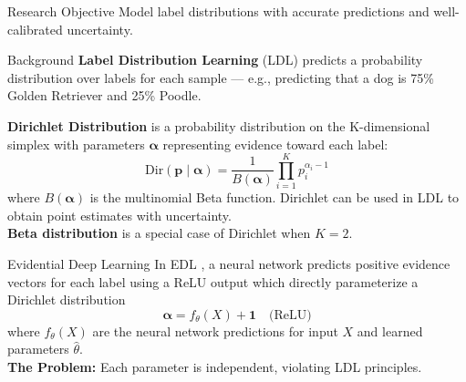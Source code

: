 \documentclass[final]{beamer}
\newlength{\sidewid}
\begin{document}
\begin{frame}
\begin{columns}[t]
\begin{column}{\sidewid} %


\begin{exampleblock}{Research Objective}
Model label distributions with accurate predictions and well-calibrated uncertainty.

\end{exampleblock}


\begin{exampleblock}{Background}
\textbf{Label Distribution Learning} (LDL) predicts a probability distribution 
over labels for each sample — e.g., predicting that a dog is 75\% Golden Retriever and 25\% 
Poodle.
\vspace{1em}

\textbf{Dirichlet Distribution}
is a probability distribution on the K-dimensional simplex with parameters $\boldsymbol{\alpha}$ representing evidence toward each label:
\begin{equation*}
    \text{Dir}(\mathbf{p} \mid \boldsymbol{\alpha}) = \frac{1}{B(\boldsymbol{\alpha})}\prod_{i=1}^K p_i^{\alpha_i - 1}
\end{equation*}
where $B(\boldsymbol{\alpha})$ is the multinomial Beta function.
Dirichlet can be used in LDL to obtain point estimates with uncertainty.\\
\vspace{1em}
\textbf{Beta distribution} is a special case of Dirichlet when $K = 2$.
\vspace{1em}
\end{exampleblock}
\begin{exampleblock}{Evidential Deep Learning} 
In EDL \cite{sensoy_evidential_2018}, a neural network predicts positive evidence vectors for each label using a ReLU output which directly parameterize a Dirichlet distribution
\begin{equation*}
    \boldsymbol{\alpha} = f_{\theta}(X)+\boldsymbol{1} \quad (\text{ReLU)}
\end{equation*}
where $f_{\theta}(X)$ are the neural network predictions for input $X$ and learned parameters $\hat\theta$.\\
\textbf{The Problem:} Each parameter is independent, violating LDL principles.
\end{exampleblock}



\end{column}
\end{columns}
\end{frame}
\end{document}
